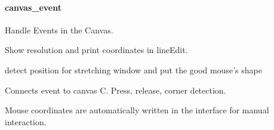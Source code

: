 \documentclass[letterpaper,10pt,openany,oneside]{sphinxmanual}
\begin{document}
\paragraph{canvas\_event}
\label{rst/visu2d:module-Visu.canvas_event}\label{rst/visu2d:canvas-event}

\begin{fulllineitems}
\label{rst/visu2d:Visu.canvas_event.CANVAS_EVENT}
Handle Events in the Canvas.

\begin{fulllineitems}
\label{rst/visu2d:Visu.canvas_event.CANVAS_EVENT.aff_param}
Show resolution and print coordinates in lineEdit.

\end{fulllineitems}


\begin{fulllineitems}
\label{rst/visu2d:Visu.canvas_event.CANVAS_EVENT.detect_corner}
detect position for stretching window and put the good mouse's shape

\end{fulllineitems}


\begin{fulllineitems}
\label{rst/visu2d:Visu.canvas_event.CANVAS_EVENT.interact_with_canvasC}
Connects event to canvas C. Press, release, corner detection.

\end{fulllineitems}


\begin{fulllineitems}
\label{rst/visu2d:Visu.canvas_event.CANVAS_EVENT.make_coord_manual}
Mouse coordinates are automatically written in the interface for manual interaction.


\end{fulllineitems}
\end{fulllineitems}
\end{document}
